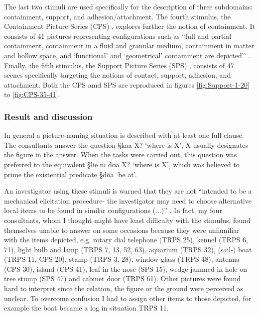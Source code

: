 

The last two stimuli  are used specifically for the description of  three
subdomains: containment, support, and adhesion/attachment.  The fourth
stimulus,  the Containment Picture Series (CPS) \citep{Meir01a},  explores
further the
notion of
containment. It consists of 41 pictures representing configurations such as
``full
and partial containment, containment in a fluid and granular medium,
containment in matter and hollow space, and  `functional’ and `geometrical’
containment are depicted''  \citep[33]{Meir01a}. Finally, the fifth stimulus,
the
Support  Picture Series (SPS)  \citep{Meir01b},  consists
of  47  scenes specifically targeting  the notions of contact, support,
adhesion, and attachment. Both the CPS amd SPS are reproduced in figures 
\ref{fig:Support-1-20} 
to \ref{fig:CPS-35-41}.


\subsubsection{Result and discussion}
\label{SPA-exper2-res-discuss}

In general a picture-naming situation  is described with at least one
full clause. The consultants answer  the question {\S kaa X?} `where is X', X
 usually designates the figure in the answer.  When the tasks were
carried out, this 
question  was preferred to the equivalent {\S lie nɪ dʊa X?} `where is X', 
which was believed to  prime the existential predicate {\S dʊa}
`be at'. 



An investigator using  these stimuli is warned  that  they are not
``intended to be a mechanical elicitation procedure- the investigator may need
to choose alternative local items to be found in similar configurations
(...)'' \cite[9]{Levi06}. In fact, my four consultants, whom I thought might
have  least difficulty with the stimulus, found themselves unable to answer
on some occasions because  they were unfamiliar with the items depicted, e.g.
rotary dial telephone  (TRPS 25), kennel (TRPS 6, 71), light bulb and lamp
(TRPS 7, 13, 52, 63), aquarium (TRPS 32), (sail-) boat (TRPS 11, CPS 20), stamp
(TRPS 3,
28), window glass (TRPS 48), antenna (CPS 30), island (CPS 41), leaf in the
nose (SPS 15), wedge jammed in hole on tree stump (SPS 47) and cabinet door
(TRPS 61).  Other pictures were
found hard to interpret since the relation, the figure or the ground were
perceived as unclear.  To overcome confusion I had to assign other
items to those depicted, for example the boat  became a log  in
situation TRPS  11.   



